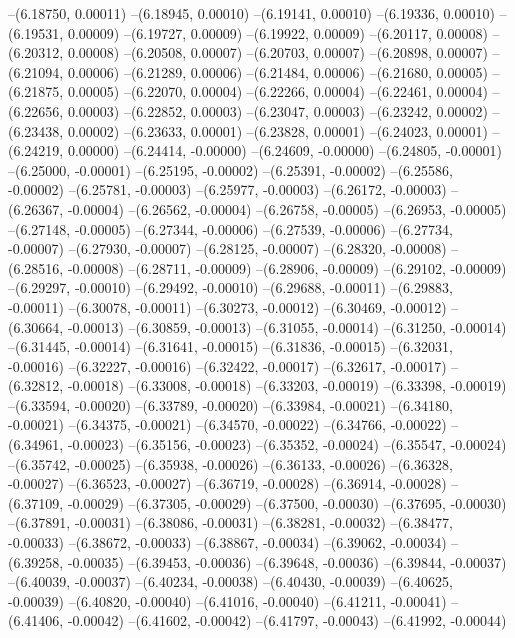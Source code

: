 --(6.18750, 0.00011)
--(6.18945, 0.00010)
--(6.19141, 0.00010)
--(6.19336, 0.00010)
--(6.19531, 0.00009)
--(6.19727, 0.00009)
--(6.19922, 0.00009)
--(6.20117, 0.00008)
--(6.20312, 0.00008)
--(6.20508, 0.00007)
--(6.20703, 0.00007)
--(6.20898, 0.00007)
--(6.21094, 0.00006)
--(6.21289, 0.00006)
--(6.21484, 0.00006)
--(6.21680, 0.00005)
--(6.21875, 0.00005)
--(6.22070, 0.00004)
--(6.22266, 0.00004)
--(6.22461, 0.00004)
--(6.22656, 0.00003)
--(6.22852, 0.00003)
--(6.23047, 0.00003)
--(6.23242, 0.00002)
--(6.23438, 0.00002)
--(6.23633, 0.00001)
--(6.23828, 0.00001)
--(6.24023, 0.00001)
--(6.24219, 0.00000)
--(6.24414, -0.00000)
--(6.24609, -0.00000)
--(6.24805, -0.00001)
--(6.25000, -0.00001)
--(6.25195, -0.00002)
--(6.25391, -0.00002)
--(6.25586, -0.00002)
--(6.25781, -0.00003)
--(6.25977, -0.00003)
--(6.26172, -0.00003)
--(6.26367, -0.00004)
--(6.26562, -0.00004)
--(6.26758, -0.00005)
--(6.26953, -0.00005)
--(6.27148, -0.00005)
--(6.27344, -0.00006)
--(6.27539, -0.00006)
--(6.27734, -0.00007)
--(6.27930, -0.00007)
--(6.28125, -0.00007)
--(6.28320, -0.00008)
--(6.28516, -0.00008)
--(6.28711, -0.00009)
--(6.28906, -0.00009)
--(6.29102, -0.00009)
--(6.29297, -0.00010)
--(6.29492, -0.00010)
--(6.29688, -0.00011)
--(6.29883, -0.00011)
--(6.30078, -0.00011)
--(6.30273, -0.00012)
--(6.30469, -0.00012)
--(6.30664, -0.00013)
--(6.30859, -0.00013)
--(6.31055, -0.00014)
--(6.31250, -0.00014)
--(6.31445, -0.00014)
--(6.31641, -0.00015)
--(6.31836, -0.00015)
--(6.32031, -0.00016)
--(6.32227, -0.00016)
--(6.32422, -0.00017)
--(6.32617, -0.00017)
--(6.32812, -0.00018)
--(6.33008, -0.00018)
--(6.33203, -0.00019)
--(6.33398, -0.00019)
--(6.33594, -0.00020)
--(6.33789, -0.00020)
--(6.33984, -0.00021)
--(6.34180, -0.00021)
--(6.34375, -0.00021)
--(6.34570, -0.00022)
--(6.34766, -0.00022)
--(6.34961, -0.00023)
--(6.35156, -0.00023)
--(6.35352, -0.00024)
--(6.35547, -0.00024)
--(6.35742, -0.00025)
--(6.35938, -0.00026)
--(6.36133, -0.00026)
--(6.36328, -0.00027)
--(6.36523, -0.00027)
--(6.36719, -0.00028)
--(6.36914, -0.00028)
--(6.37109, -0.00029)
--(6.37305, -0.00029)
--(6.37500, -0.00030)
--(6.37695, -0.00030)
--(6.37891, -0.00031)
--(6.38086, -0.00031)
--(6.38281, -0.00032)
--(6.38477, -0.00033)
--(6.38672, -0.00033)
--(6.38867, -0.00034)
--(6.39062, -0.00034)
--(6.39258, -0.00035)
--(6.39453, -0.00036)
--(6.39648, -0.00036)
--(6.39844, -0.00037)
--(6.40039, -0.00037)
--(6.40234, -0.00038)
--(6.40430, -0.00039)
--(6.40625, -0.00039)
--(6.40820, -0.00040)
--(6.41016, -0.00040)
--(6.41211, -0.00041)
--(6.41406, -0.00042)
--(6.41602, -0.00042)
--(6.41797, -0.00043)
--(6.41992, -0.00044)
